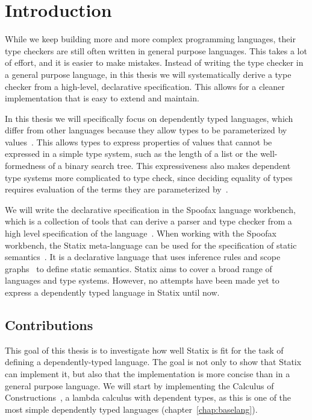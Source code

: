 \chapter{Introduction}

While we keep building more and more complex programming languages, their type checkers are still often written in general purpose languages. This takes a lot of effort, and it is easier to make mistakes. Instead of writing the type checker in a general purpose language, in this thesis we will systematically derive a type checker from a high-level, declarative specification. This allows for a cleaner implementation that is easy to extend and maintain. 

In this thesis we will specifically focus on dependently typed languages, which differ from other languages because they allow types to be parameterized by values~\cite{lambda_cube}. This allows types to express properties of values that cannot be expressed in a simple type system, such as the length of a list or the well-formedness of a binary search tree. This expressiveness also makes dependent type systems more complicated to type check, since deciding equality of types requires evaluation of the terms they are parameterized by~\cite{Coquand_Huet_1988}. 

We will write the declarative specification in the Spoofax language workbench, which is a collection of tools that can derive a parser and type checker from a high level specification of the language~\cite{spoofax}. When working with the Spoofax workbench, the Statix meta-language can be used for the specification of static semantics~\cite{scopes_as_types}. It is a declarative language that uses inference rules and scope graphs~\cite{scope_graphs} to define static semantics. Statix aims to cover a broad range of languages and type systems. However, no attempts have been made yet to express a dependently typed language in Statix until now.
 

\section*{Contributions}
This goal of this thesis is to investigate how well Statix is fit for the task of defining a dependently-typed language. The goal is not only to show that Statix can implement it, but also that the implementation is more concise than in a general purpose language. We will start by implementing the Calculus of Constructions~\cite{Coquand_Huet_1988}, a lambda calculus with dependent types, as this is one of the most simple dependently typed languages (chapter~\ref{chap:baselang}). 

